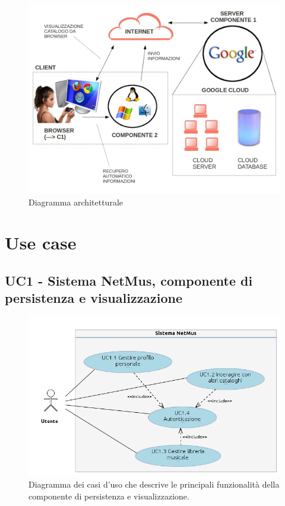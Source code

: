 \begin{figure}[h]
  \centering
  \includegraphics[width=16cm]{img/AR/DiagrammaArchitetturale.png}
\caption{Diagramma architetturale}
\end{figure}

\chapter{Use case}
\thispagestyle{fancy}

\section{UC1 - Sistema NetMus, componente di persistenza e visualizzazione}

\begin{figure}[h]
  \centering
  \includegraphics[width=14.5cm]{img/AR/UC1.png}
\caption{Diagramma dei casi d'uso che descrive le principali funzionalit\`a della
componente di persistenza e visualizzazione.}
\end{figure}

